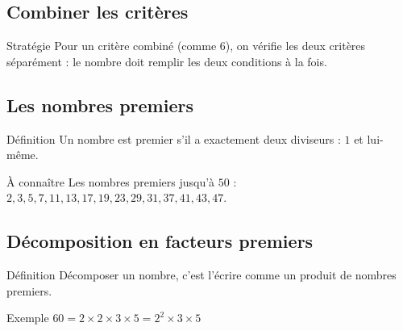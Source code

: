 \vspace{10pt}
\subsection{Combiner les critères}

\begin{astuce}{Stratégie}
Pour un critère combiné (comme $6$), on vérifie les deux critères séparément : le nombre doit remplir les deux conditions à la fois.
\end{astuce}


\newpage
\semaineinvisible
{} 

\vfill
\subsection{Les nombres premiers}

\begin{regle}{Définition}
Un nombre est \textcolor{themeColor}{premier} s'il a exactement deux diviseurs : $1$ et lui-même.
\end{regle}

\vspace{6pt}
\begin{astuce}{À connaître}
Les nombres premiers jusqu'à $50$ : $2, 3, 5, 7, 11, 13, 17, 19, 23, 29, 31, 37, 41, 43, 47$.
\end{astuce}

\vspace{10pt}
\subsection{Décomposition en facteurs premiers}

\begin{regle}{Définition}
Décomposer un nombre, c'est l'écrire comme un produit de nombres premiers.
\end{regle}

\vspace{6pt}
\begin{astuce}{Exemple}
$60 = 2 \times 2 \times 3 \times 5 = 2^2 \times 3 \times 5$
\end{astuce}

\vspace{10pt}

